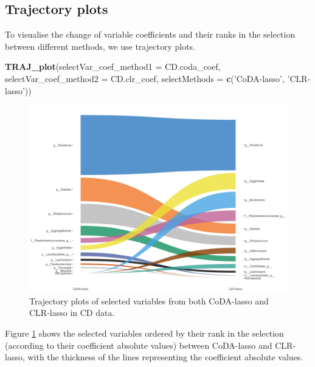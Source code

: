 \documentclass[openany]{book}
\newenvironment{Shaded}{\begin{snugshade}}{\end{snugshade}}
\newcommand{\KeywordTok}[1]{\textcolor[rgb]{0.13,0.29,0.53}{\textbf{#1}}}
\newcommand{\DataTypeTok}[1]{\textcolor[rgb]{0.13,0.29,0.53}{#1}}
\newcommand{\StringTok}[1]{\textcolor[rgb]{0.31,0.60,0.02}{#1}}
\newcommand{\NormalTok}[1]{#1}
\begin{document}
\subsection{Trajectory plots}\label{trajectory-plots}

To visualise the change of variable coefficients and their ranks in the
selection between different methods, we use trajectory plots.

\begin{Shaded}
\begin{Highlighting}[]
\KeywordTok{TRAJ_plot}\NormalTok{(}\DataTypeTok{selectVar_coef_method1 =}\NormalTok{ CD.coda_coef, }\DataTypeTok{selectVar_coef_method2 =}\NormalTok{ CD.clr_coef, }
          \DataTypeTok{selectMethods =} \KeywordTok{c}\NormalTok{(}\StringTok{'CoDA-lasso'}\NormalTok{, }\StringTok{'CLR-lasso'}\NormalTok{))}
\end{Highlighting}
\end{Shaded}

\begin{figure}

{\centering \includegraphics[width=1\linewidth]{./Generated_plots/trajCD-1} 

}

\caption{Trajectory plots of selected variables from both CoDA-lasso and CLR-lasso in CD data.}\label{fig:trajCD}
\end{figure}

Figure \ref{fig:trajCD} shows the selected variables ordered by their
rank in the selection (according to their coefficient absolute values)
between CoDA-lasso and CLR-lasso, with the thickness of the lines
representing the coefficient absolute values.
\end{document}
